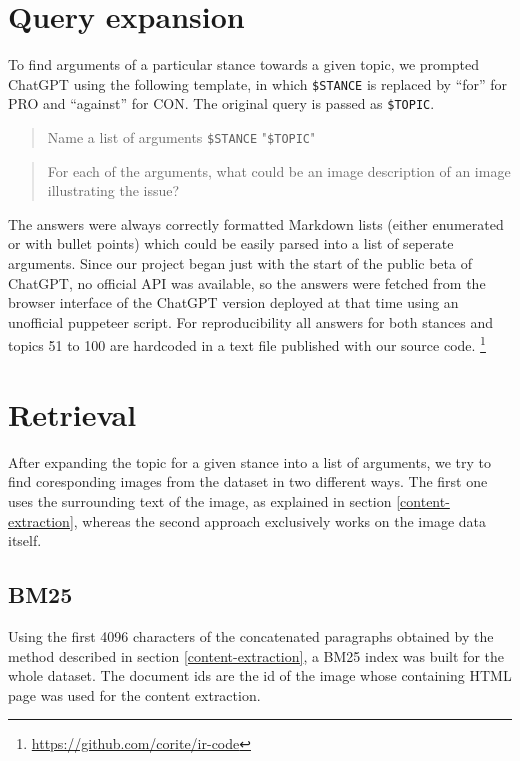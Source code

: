 \documentclass[
]{ceurart}
\begin{document}
\section{Query expansion}

To find arguments of a particular stance towards a given topic, we prompted ChatGPT using the following template, in which \texttt{\$STANCE} is replaced by \enquote{for} for PRO and \enquote{against} for CON. The original query is passed as \texttt{\$TOPIC}.

\begin{quote}
	Name a list of arguments \texttt{\$STANCE} "\texttt{\$TOPIC}"
\end{quote}
\begin{quote}
    For each of the arguments, what could be an image description of an image illustrating the issue?
\end{quote}

The answers were always correctly formatted Markdown lists (either enumerated or with bullet points) which could be easily parsed into a list of seperate arguments. Since our project began just with the start of the public beta of ChatGPT, no official API was available, so the answers were fetched from the browser interface of the ChatGPT version deployed at that time using an unofficial puppeteer script. For reproducibility all answers for both stances and topics 51 to 100 are hardcoded in a text file published with our source code. \footnote{\url{https://github.com/corite/ir-code}}

\section{Retrieval}

After expanding the topic for a given stance into a list of arguments, we try to find coresponding images from the dataset in two different ways. The first one uses the surrounding text of the image, as explained in section \ref{content-extraction}, whereas the second approach exclusively works on the image data itself.

\subsection{BM25}

Using the first 4096 characters of the concatenated paragraphs obtained by the method described in section \ref{content-extraction}, a BM25 index was built for the whole dataset. The document ids are the id of the image whose containing HTML page was used for the content extraction.
\end{document}
